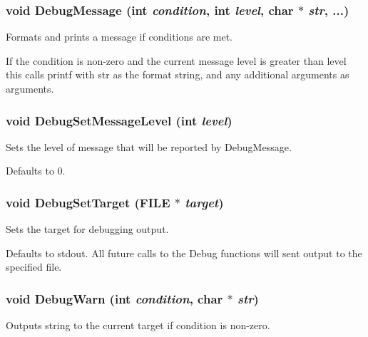 \subsubsection{\setlength{\rightskip}{0pt plus 5cm}void Debug\-Message (int {\em condition}, int {\em level}, char $\ast$ {\em str}, ...)}\label{Debug_8h_a4}


Formats and prints a message if conditions are met. 

If the condition is non-zero and the current message level is greater than level this calls printf with str as the format string, and any additional arguments as arguments. 
\subsubsection{\setlength{\rightskip}{0pt plus 5cm}void Debug\-Set\-Message\-Level (int {\em level})}\label{Debug_8h_a2}


Sets the level of message that will be reported by Debug\-Message. 

Defaults to 0. 
\subsubsection{\setlength{\rightskip}{0pt plus 5cm}void Debug\-Set\-Target (FILE $\ast$ {\em target})}\label{Debug_8h_a5}


Sets the target for debugging output. 

Defaults to stdout. All future calls to the Debug functions will sent output to the specified file. 
\subsubsection{\setlength{\rightskip}{0pt plus 5cm}void Debug\-Warn (int {\em condition}, char $\ast$ {\em str})}\label{Debug_8h_a0}


Outputs string to the current target if condition is non-zero. 

